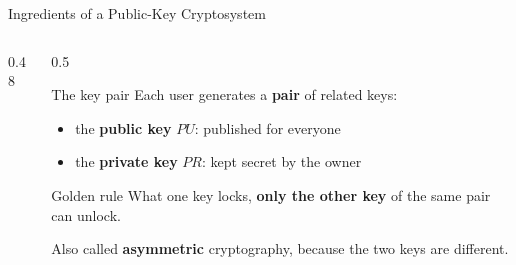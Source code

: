 \documentclass[aspectratio=169,11pt,xcolor={table}]{beamer}
\begin{document}
\begin{frame}{Ingredients of a Public-Key Cryptosystem}
  \begin{columns}[c]
    \begin{column}{0.48\textwidth}
      \centering
    \end{column}
    \begin{column}{0.5\textwidth}
      \begin{block}{The key pair}
        \small Each user generates a \textbf{pair} of related keys:
        \begin{itemize}\setlength{\itemsep}{1pt}
          \item the \textbf{public key} $PU$: published for everyone
          \item the \textbf{private key} $PR$: kept secret by the owner
        \end{itemize}
      \end{block}
      \begin{exampleblock}{Golden rule}
        \small What one key locks, \textbf{only the other key} of the same pair can unlock.
      \end{exampleblock}
      {\small Also called \textbf{asymmetric} cryptography, because the two keys are different.}
    \end{column}
  \end{columns}
\end{frame}
\end{document}
